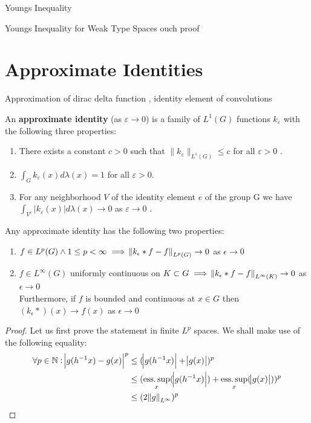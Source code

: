 \begin{theorem}
Youngs Inequality
\end{theorem}


\begin{theorem}
Youngs Inequality for Weak Type Spaces
ouch proof
\end{theorem}

\section{Approximate Identities}

Approximation of dirac delta function , identity element of convolutions

\begin{definition}
An \textbf{approximate identity} (as $\varepsilon \rightarrow 0$) is a family of $L^1(G)$ functions $k_\varepsilon$ with the following three properties: 
\begin{enumerate}[label=(\roman*)]
\item There exists a constant $c > 0$ such that $\| k_\varepsilon \| _ {L^1(G)} \leqslant c$ for all $ \varepsilon > 0 $ . 
\item $ \int_G k_\varepsilon(x) d\lambda(x) = 1$ for all $\varepsilon > 0 $.
\item For any neighborhood $V$ of the identity element $e$ of the group G we have $ \int_{V^c} | k_\varepsilon(x) | d \lambda(x) \rightarrow 0  $ as $ \varepsilon \rightarrow 0 $ . 
\end{enumerate}
\end{definition}

\begin{theorem}
Any approximate identity has the following two properties:
\begin{enumerate}
\item $f \in L^p(G) \wedge 1 \leq p < \infty \implies \norm{k_\epsilon \ast f - f}_{L^p(G)} \to 0 $ as $ \epsilon \to 0$
\item $f \in L^\infty(G)$ uniformly continuous on $K \subset G \implies \norm{k_\epsilon \ast f - f}_{L^\infty(K)} \to 0$ as $\epsilon \to 0$ \\
Furthermore, if $f$ is bounded and continuous at $x \in G$ then
$ (k_\epsilon \ast )(x) \to f(x) $ as $\epsilon \to 0$ 
\end{enumerate}
\end{theorem}

\begin{proof}
Let us first prove the statement in finite $L^p$ spaces. We shall make use of the following equality:
\begin{align*}
\forall p \in \mathbb{N} : \abs{g(h^{-1}x) - g(x)}^p &\leq (\abs{g(h^{-1}x)}+\abs{g(x)})^p \\
&\leq (\esssup_x (\abs{g(h^{-1}x)} )+\esssup_x(\abs{g(x)}) )^p \\
&\leq (2\norm{g}_{L^\infty})^p
\end{align*}
\end{proof}


